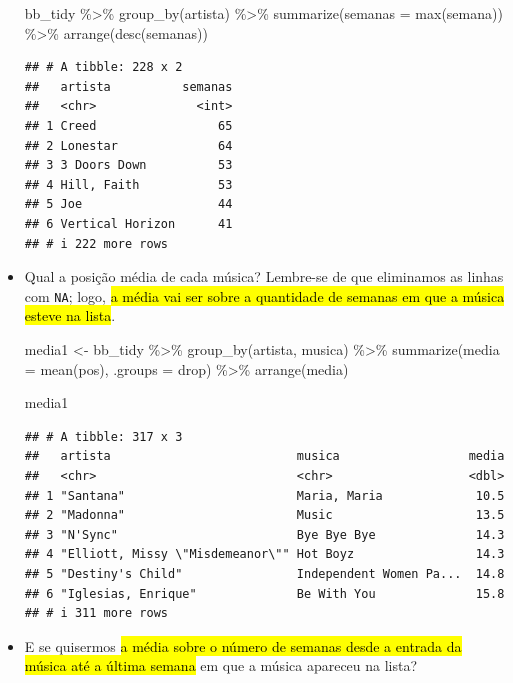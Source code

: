 \documentclass[
  11pt]{report}
\newenvironment{Shaded}{\begin{snugshade}}{\end{snugshade}}
\newcommand{\AttributeTok}[1]{\textcolor[rgb]{0.77,0.63,0.00}{#1}}
\newcommand{\FunctionTok}[1]{\textcolor[rgb]{0.00,0.00,0.00}{#1}}
\newcommand{\NormalTok}[1]{#1}
\newcommand{\OtherTok}[1]{\textcolor[rgb]{0.56,0.35,0.01}{#1}}
\newcommand{\SpecialCharTok}[1]{\textcolor[rgb]{0.00,0.00,0.00}{#1}}
\newcommand{\StringTok}[1]{\textcolor[rgb]{0.31,0.60,0.02}{#1}}
\renewenvironment{Shaded}{
    \begin{mdframed}[%
      roundcorner=2pt,%
      innerleftmargin=5pt,%
      innerrightmargin=5pt,%
      topline=true,%
      leftline=true,%
      rightline=true,%
      bottomline=true,%
      linewidth=0.5pt,%
      linecolor=black!20,%
      backgroundcolor=black!2,%
      skipabove=2ex,%
      skipbelow=2.5ex%
    ]%
  }
  {
    \end{mdframed}
  }
\begin{document}
\begin{itemize}
\begin{Shaded}
\begin{Highlighting}[]
\NormalTok{bb\_tidy }\SpecialCharTok{\%\textgreater{}\%} 
  \FunctionTok{group\_by}\NormalTok{(artista) }\SpecialCharTok{\%\textgreater{}\%} 
  \FunctionTok{summarize}\NormalTok{(}\AttributeTok{semanas =} \FunctionTok{max}\NormalTok{(semana)) }\SpecialCharTok{\%\textgreater{}\%} 
  \FunctionTok{arrange}\NormalTok{(}\FunctionTok{desc}\NormalTok{(semanas))}
\end{Highlighting}
\end{Shaded}

\begin{verbatim}
## # A tibble: 228 x 2
##   artista          semanas
##   <chr>              <int>
## 1 Creed                 65
## 2 Lonestar              64
## 3 3 Doors Down          53
## 4 Hill, Faith           53
## 5 Joe                   44
## 6 Vertical Horizon      41
## # i 222 more rows
\end{verbatim}
\item
  Qual a posição média de cada música? Lembre-se de que eliminamos as linhas com \texttt{NA}; logo, {\hl{a média vai ser sobre a quantidade de semanas em que a música esteve na lista}}.

\begin{Shaded}
\begin{Highlighting}[]
\NormalTok{media1 }\OtherTok{\textless{}{-}}\NormalTok{ bb\_tidy }\SpecialCharTok{\%\textgreater{}\%} 
  \FunctionTok{group\_by}\NormalTok{(artista, musica) }\SpecialCharTok{\%\textgreater{}\%} 
  \FunctionTok{summarize}\NormalTok{(}\AttributeTok{media =} \FunctionTok{mean}\NormalTok{(pos), }\AttributeTok{.groups =} \StringTok{\textquotesingle{}drop\textquotesingle{}}\NormalTok{) }\SpecialCharTok{\%\textgreater{}\%} 
  \FunctionTok{arrange}\NormalTok{(media)}

\NormalTok{media1}
\end{Highlighting}
\end{Shaded}

\begin{verbatim}
## # A tibble: 317 x 3
##   artista                          musica                  media
##   <chr>                            <chr>                   <dbl>
## 1 "Santana"                        Maria, Maria             10.5
## 2 "Madonna"                        Music                    13.5
## 3 "N'Sync"                         Bye Bye Bye              14.3
## 4 "Elliott, Missy \"Misdemeanor\"" Hot Boyz                 14.3
## 5 "Destiny's Child"                Independent Women Pa...  14.8
## 6 "Iglesias, Enrique"              Be With You              15.8
## # i 311 more rows
\end{verbatim}
\item
  E se quisermos {\hl{a média sobre o número de semanas desde a entrada da música até a última semana}} em que a música apareceu na lista?


\end{itemize}
\end{document}
